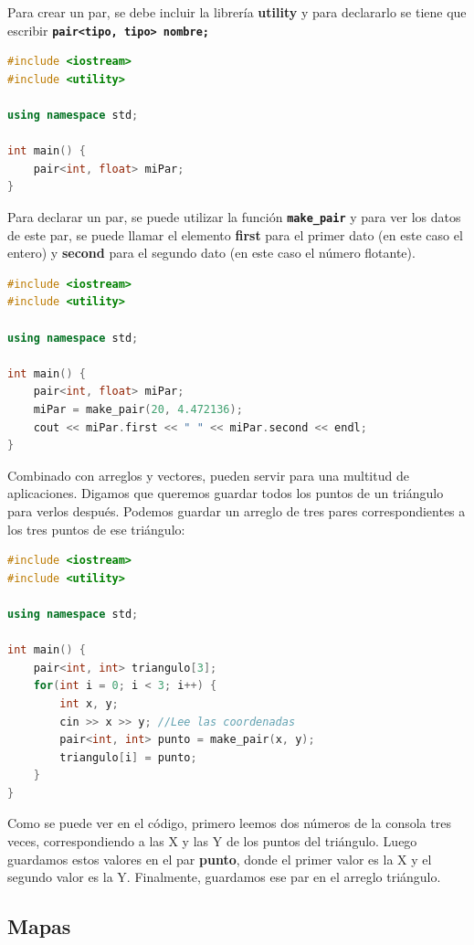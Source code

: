 \documentclass{article}
\begin{document}
Para crear un par, se debe incluir la librería \textbf{utility} y para declararlo se tiene que escribir \textbf{\lstinline{pair<tipo, tipo> nombre;}}

\begin{lstlisting}[language=C++, title=Declarando pares]
#include <iostream>
#include <utility>

using namespace std;

int main() {
	pair<int, float> miPar;
}
\end{lstlisting}

Para declarar un par, se puede utilizar la función \textbf{\lstinline{make_pair}} y para ver los datos de este par, se puede llamar el elemento \textbf{first} para el primer dato (en este caso el entero) y \textbf{second} para el segundo dato (en este caso el número flotante).

\begin{lstlisting}[language=C++, title=Declarando pares]
#include <iostream>
#include <utility>

using namespace std;

int main() {
	pair<int, float> miPar;
	miPar = make_pair(20, 4.472136);
	cout << miPar.first << " " << miPar.second << endl;
}
\end{lstlisting}

Combinado con arreglos y vectores, pueden servir para una multitud de aplicaciones. Digamos que queremos guardar todos los puntos de un triángulo para verlos después. Podemos guardar un arreglo de tres pares correspondientes a los tres puntos de ese triángulo:

\begin{lstlisting}[language=C++, title=Arreglo de pares]
#include <iostream>
#include <utility>

using namespace std;

int main() {
	pair<int, int> triangulo[3];
	for(int i = 0; i < 3; i++) {
		int x, y;
		cin >> x >> y; //Lee las coordenadas
		pair<int, int> punto = make_pair(x, y);
		triangulo[i] = punto;
	}
}
\end{lstlisting}

Como se puede ver en el código, primero leemos dos números de la consola tres veces, correspondiendo a las X y las Y de los puntos del triángulo. Luego guardamos estos valores en el par \textbf{punto}, donde el primer valor es la X y el segundo valor es la Y. Finalmente, guardamos ese par en el arreglo triángulo.

\subsection{Mapas}
\end{document}
